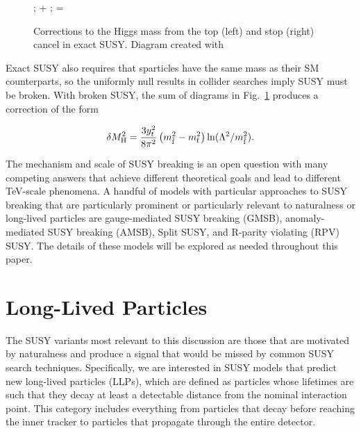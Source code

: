 \documentclass[12pt]{article}
\begin{document}
    \noindent \begin{figure}[htbp] \begin{center}
        ;
    \quad + \quad
        ;
        \quad =  \quad
        \caption{Corrections to the Higgs mass from the top (left) and stop (right) cancel in exact SUSY. Diagram created with~\cite{tikz}}
        \label{exact_susy_correction}
    \end{center} \end{figure}

    Exact SUSY also requires that sparticles have the same mass as their SM counterparts, so the uniformly null results in collider searches imply SUSY must be broken. With broken SUSY, the sum of diagrams in Fig.~\ref{exact_susy_correction} produces a correction of the form~\cite{feng}

    \noindent \begin{equation}
        \delta M_{\mathrm{H}}^2 = \frac{3y_t^2}{8\pi^2}\left(m_{\tilde{\mathrm{f}}}^2 - m_{\mathrm{f}}^2 \right)\ln(\Lambda^2/m_{\tilde{\mathrm{f}}}^2).
    \label{higgs_susy_correction}
    \end{equation}
    
    The mechanism and scale of SUSY breaking is an open question with many competing answers that achieve different theoretical goals and lead to different TeV-scale phenomena. A handful of models with particular approaches to SUSY breaking that are particularly prominent or particularly relevant to naturalness or long-lived particles are gauge-mediated SUSY breaking (GMSB), anomaly-mediated SUSY breaking (AMSB), Split SUSY, and R-parity violating (RPV) SUSY. The details of these models will be explored as needed throughout this paper.

\section{Long-Lived Particles}
    The SUSY variants most relevant to this discussion are those that are motivated by naturalness and  produce a signal that would be missed by common SUSY search techniques. Specifically, we are interested in SUSY models that predict new long-lived particles (LLPs), which are defined as particles whose lifetimes are such that they decay at least a detectable distance from the nominal interaction point. This category includes everything from particles that decay before reaching the inner tracker to particles that propagate through the entire detector. 
\end{document}

